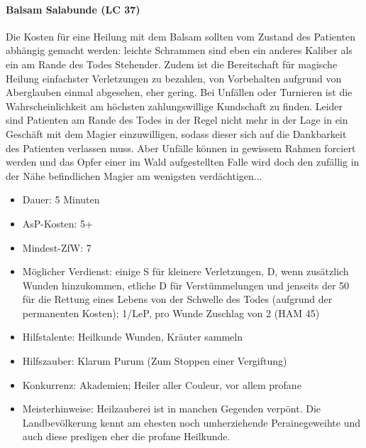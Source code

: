 \paragraph{Balsam Salabunde (LC 37)}
Die Kosten für eine Heilung mit dem Balsam sollten vom Zustand des Patienten abhängig gemacht werden: leichte Schrammen sind eben ein anderes Kaliber als ein am Rande des Todes Stehender. Zudem ist die Bereitschaft für magische Heilung einfachster Verletzungen zu bezahlen, von Vorbehalten aufgrund von Aberglauben einmal abgesehen, eher gering. Bei Unfällen oder Turnieren ist die Wahrscheinlichkeit am höchsten zahlungswillige Kundschaft zu finden. Leider sind Patienten am Rande des Todes in der Regel nicht mehr in der Lage in ein Geschäft mit dem Magier einzuwilligen, sodass dieser sich auf die Dankbarkeit des Patienten verlassen muss. Aber Unfälle können in gewissem Rahmen forciert werden und das Opfer einer im Wald aufgestellten Falle wird doch den zufällig in der Nähe befindlichen Magier am wenigsten verdächtigen...
\begin{itemize}
	\item Dauer: 5 Minuten
	\item AsP-Kosten: 5+
	\item Mindest-ZfW: 7
	\item Möglicher Verdienst: einige S für kleinere Verletzungen, D, wenn zusätzlich Wunden hinzukommen, etliche D für Verstümmelungen und jenseits der \SI{50}{\D} für die Rettung eines Lebens von der Schwelle des Todes (aufgrund der permanenten Kosten); \SI{1}{\D}/LeP, pro Wunde Zuschlag von \SI{2}{\D} (HAM 45)
	\item Hilfstalente: Heilkunde Wunden, Kräuter sammeln
	\item Hilfszauber: Klarum Purum (Zum Stoppen einer Vergiftung)
	\item Konkurrenz: Akademien; Heiler aller Couleur, vor allem profane
	\item Meisterhinweise: Heilzauberei ist in manchen Gegenden verpönt. Die Landbevölkerung kennt am ehesten noch umherziehende Perainegeweihte und auch diese predigen eher die profane Heilkunde.
\end{itemize}

